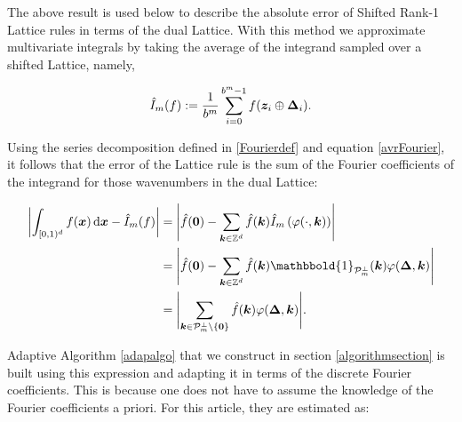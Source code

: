 \documentclass[graybox]{svmult}
\newcommand{\Z}{\mathbb{Z}} %
\newcommand{\bszero}{\boldsymbol{0}} %
\newcommand{\bsx}{\boldsymbol{x}}    %
\newcommand{\bsz}{\boldsymbol{z}}    %
\newcommand{\bsDelta}{\boldsymbol{\Delta}}    %
\newcommand{\ind}{\mathbbold{1}}
\begin{document}
The above result is used below to describe the absolute error of Shifted Rank-1 Lattice rules in terms of the dual Lattice. With this method we approximate multivariate integrals by taking the average of the integrand sampled over a shifted Lattice, namely,

\begin{equation} \label{cubaturedef}
\hI_m(f) := \frac{1}{b^m} \sum_{i=0}^{b^m-1} f(\bsz_i \oplus\bsDelta_i).
\end{equation}

Using the series decomposition defined in \eqref{Fourierdef} and equation \eqref{avrFourier}, it follows that the error of the Lattice rule is the sum of the Fourier coefficients of the integrand for those wavenumbers in the dual Lattice:

\begin{align}
\nonumber
\biggabs{ \int_{\cube} f(\bsx) \, \D \bsx - \hI_m(f)} 
& = \Biggabs {\hf(\bszero) - \sum_{\bsk \in \Z^d} \hf(\bsk) \hI_m\left(\varphi(\cdot,\bsk)\right)} \\
\nonumber
& = \Biggabs {\hf(\bszero) - \sum_{\bsk \in \Z^d} \hf(\bsk) \ind_{\cp_m^{\perp}}(\bsk) \varphi(\bsDelta,\bsk)} \\ 
& = \Biggabs {\sum_{\bsk \in \cp_m^{\perp}\setminus \{\bszero\} } \hf(\bsk)  \varphi(\bsDelta,\bsk)}. \label{err1}
\end{align}

Adaptive Algorithm \ref{adapalgo} that we construct in section \ref{algorithmsection} is built using this expression and adapting it in terms of the discrete Fourier coefficients. This is because one does not have to assume the knowledge of the Fourier coefficients a priori. For this article, they are estimated as:
\end{document}
